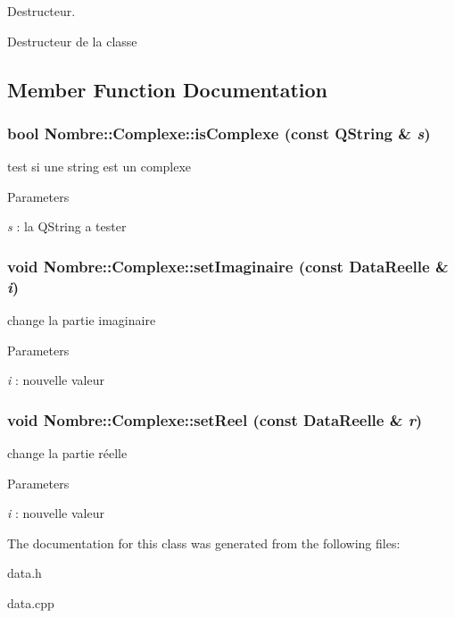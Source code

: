 Destructeur. 

Destructeur de la classe 

\subsection{Member Function Documentation}
\hypertarget{classNombre_1_1Complexe_a6f932e9575a070a064868873d66962b8}{
\subsubsection[{isComplexe}]{\setlength{\rightskip}{0pt plus 5cm}bool Nombre::Complexe::isComplexe (const QString \& {\em s})}}
\label{classNombre_1_1Complexe_a6f932e9575a070a064868873d66962b8}


test si une string est un complexe 


\begin{DoxyParams}{Parameters}
\item[{\em s}]: la QString a tester \end{DoxyParams}
\hypertarget{classNombre_1_1Complexe_af35fa6553144a161972f14d93c6ec954}{
\subsubsection[{setImaginaire}]{\setlength{\rightskip}{0pt plus 5cm}void Nombre::Complexe::setImaginaire (const {\bf DataReelle} \& {\em i})}}
\label{classNombre_1_1Complexe_af35fa6553144a161972f14d93c6ec954}


change la partie imaginaire 


\begin{DoxyParams}{Parameters}
\item[{\em i}]: nouvelle valeur \end{DoxyParams}
\hypertarget{classNombre_1_1Complexe_a498bde3887a4c785d51af6d64999f822}{
\subsubsection[{setReel}]{\setlength{\rightskip}{0pt plus 5cm}void Nombre::Complexe::setReel (const {\bf DataReelle} \& {\em r})}}
\label{classNombre_1_1Complexe_a498bde3887a4c785d51af6d64999f822}


change la partie réelle 


\begin{DoxyParams}{Parameters}
\item[{\em i}]: nouvelle valeur \end{DoxyParams}


The documentation for this class was generated from the following files:\begin{DoxyCompactItemize}
\item 
data.h\item 
data.cpp\end{DoxyCompactItemize}
